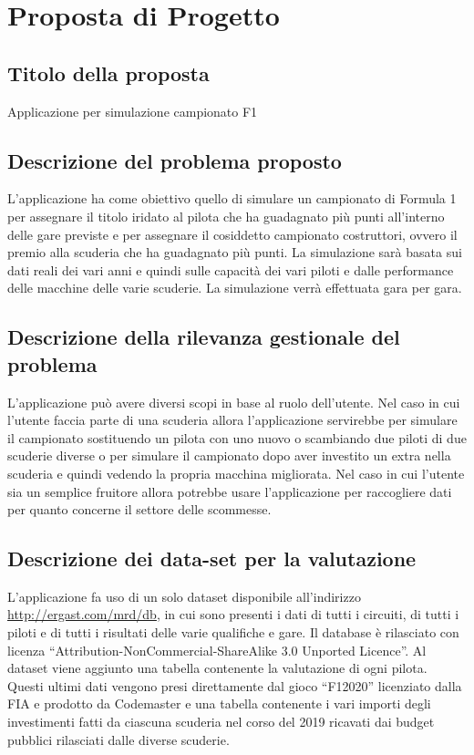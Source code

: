 \chapter{Proposta di Progetto}
\label{sec:proposta di progetto}

\section[Titolo della proposta]{Titolo della proposta} %
Applicazione per simulazione campionato F1
\section[Descrizione del problema proposto ]{Descrizione del problema proposto} %
L'applicazione ha come obiettivo quello di simulare un campionato di Formula 1 per assegnare il titolo iridato al pilota che ha guadagnato più punti all'interno delle gare previste e per assegnare il cosiddetto campionato costruttori, ovvero il premio alla scuderia che ha guadagnato più punti. La simulazione sarà basata sui dati reali dei vari anni e quindi sulle capacità dei vari piloti e dalle performance delle macchine delle varie scuderie. La simulazione verrà effettuata gara per gara.
\section[Descrizione della rilevanza gestionale del problema]{Descrizione della rilevanza gestionale del problema} %
L’applicazione può avere diversi scopi in base al ruolo dell’utente. Nel caso in cui l’utente faccia parte di una scuderia allora l’applicazione servirebbe per simulare il campionato sostituendo un pilota con uno nuovo o scambiando due piloti di due scuderie diverse o per simulare il campionato dopo aver investito un extra nella scuderia e quindi vedendo la propria macchina migliorata. Nel caso in cui l’utente sia un semplice fruitore allora potrebbe usare l’applicazione per raccogliere dati per quanto concerne il settore delle scommesse.
\section[Descrizione dei data-set per la valutazione]{Descrizione dei data-set per la valutazione} %
L’applicazione fa uso di un solo dataset disponibile all’indirizzo \\\url{http://ergast.com/mrd/db}, in cui sono presenti i dati di tutti i circuiti, di tutti i piloti e di tutti i risultati delle varie qualifiche e gare. Il database è rilasciato con licenza “Attribution-NonCommercial-ShareAlike 3.0 Unported Licence”. Al dataset viene aggiunto una tabella contenente la valutazione di ogni pilota. Questi ultimi dati vengono presi direttamente dal gioco “F12020” licenziato dalla FIA e prodotto da Codemaster e una tabella contenente i vari importi degli investimenti fatti da ciascuna scuderia nel corso del 2019 ricavati dai budget pubblici rilasciati dalle diverse scuderie.
